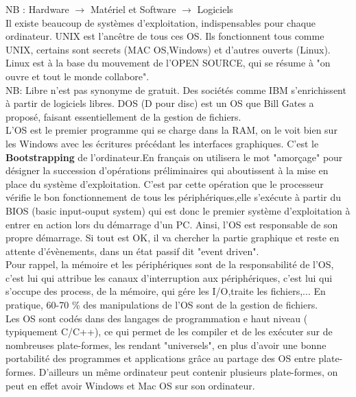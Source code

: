 \documentclass{report}
\begin{document}
NB : Hardware $\rightarrow$ Matériel et Software $\rightarrow$ Logiciels \\

Il existe beaucoup de systèmes d'exploitation, indispensables pour chaque ordinateur. UNIX est l'ancêtre de tous ces OS. Ils fonctionnent tous comme UNIX, certains sont secrets (MAC OS,Windows) et d'autres ouverts (Linux). Linux est à la base du mouvement de l'OPEN SOURCE, qui se résume à "on ouvre et tout le monde collabore".\\
NB: Libre n'est pas synonyme de gratuit. Des sociétés comme IBM s'enrichissent à partir de logiciels libres.
DOS (D pour disc) est un OS que Bill Gates a proposé, faisant essentiellement de la gestion de fichiers.\\



L'OS est le premier programme qui se charge dans la RAM, on le voit bien sur les Windows avec les écritures précédant les interfaces graphiques. C'est le {\bf Bootstrapping} de l'ordinateur.En français on utilisera le mot "amorçage" pour désigner la succession d'opérations préliminaires qui aboutissent à la mise en place du système d'exploitation. C'est par cette opération que le processeur vérifie le bon fonctionnement de tous les périphériques,elle s'exécute à partir du BIOS (basic input-ouput system) qui est donc le premier système d'exploitation à entrer en action lors du démarrage d'un PC. Ainsi, l'OS est responsable de son propre démarrage. Si tout est OK, il va chercher la partie graphique et reste en attente d'évènements, dans un état passif dit "event driven".\\
Pour rappel, la mémoire et les périphériques sont de la responsabilité de l'OS, c'est lui qui attribue les canaux d'interruption aux périphériques, c'est lui qui s'occupe des process, de la mémoire, qui gére les I/O,traite les fichiers,... En pratique, 60-70 \% des manipulations de l'OS sont de la gestion de fichiers. \\

Les OS sont codés dans des langages de programmation e haut niveau ( typiquement C/C++), ce qui permet de les compiler et de les exécuter sur de nombreuses plate-formes, les rendant "universels", en plus d'avoir une bonne portabilité des programmes et applications grâce au partage des OS entre plate-formes. D'ailleurs un même ordinateur peut contenir plusieurs plate-formes, on peut en effet avoir Windows et Mac OS sur son ordinateur.\\
\end{document}
